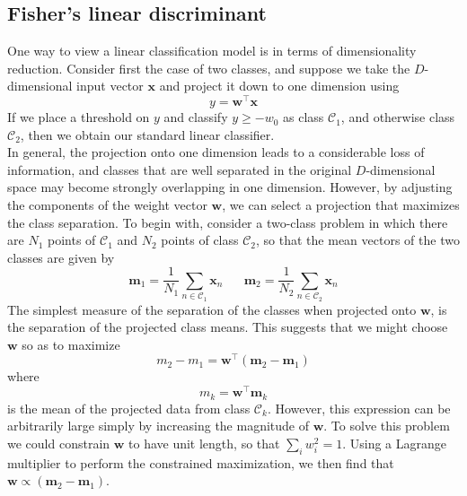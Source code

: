 \documentclass[twoside]{article}
\begin{document}
\subsection{Fisher’s linear discriminant}
One way to view a linear classification model is in terms of dimensionality reduction. Consider first the case of two classes, and suppose we take the $D$-dimensional input vector $\boldsymbol{x}$ and project it down to one dimension using
\begin{equation*}
    y = \boldsymbol{w^\intercal x}
\end{equation*}
If we place a threshold on $y$ and classify $y \geq -w_0$ as class $\mathcal{C}_1$, and otherwise class $\mathcal{C}_2$, then we obtain our standard linear classifier.\\
In general, the projection onto one dimension leads to a considerable loss of information, and classes that are well separated in the original $D$-dimensional space may become strongly overlapping in one dimension. However, by adjusting the components of the weight vector $\boldsymbol{w}$, we can select a projection that maximizes the class separation. To begin with, consider a two-class problem in which there are $N_1$ points of $\mathcal{C}_1$ and $N_2$ points of class $\mathcal{C}_2$, so that the mean vectors of the two classes are given by
\begin{equation*}
    \boldsymbol{m}_1 = \frac{1}{N_1}\sum\limits_{n \in \mathcal{C}_1} \boldsymbol{x}_n
    \hspace{20pt}
    \boldsymbol{m}_2 = \frac{1}{N_2}\sum\limits_{n \in \mathcal{C}_2} \boldsymbol{x}_n
\end{equation*}
The simplest measure of the separation of the classes when projected onto $\boldsymbol{w}$, is the separation of the projected class means. This suggests that we might choose $\boldsymbol{w}$ so as to maximize
\begin{equation*}
    m_2 - m_1 = \boldsymbol{w}^\intercal(\boldsymbol{m}_2 - \boldsymbol{m}_1)
\end{equation*}
where 
\begin{equation*}
    m_k = \boldsymbol{w}^\intercal\boldsymbol{m}_k
\end{equation*}
is the mean of the projected data from class $\mathcal{C}_k$. However, this expression can be arbitrarily large simply by increasing the magnitude of $\boldsymbol{w}$. To solve this problem we could constrain $\boldsymbol{w}$ to have unit length, so that $\sum_i w_i^2 = 1$. Using a Lagrange multiplier to perform the constrained maximization, we then find that $\boldsymbol{w} \propto (\boldsymbol{m}_2 - \boldsymbol{m}_1)$. \\
\end{document}
